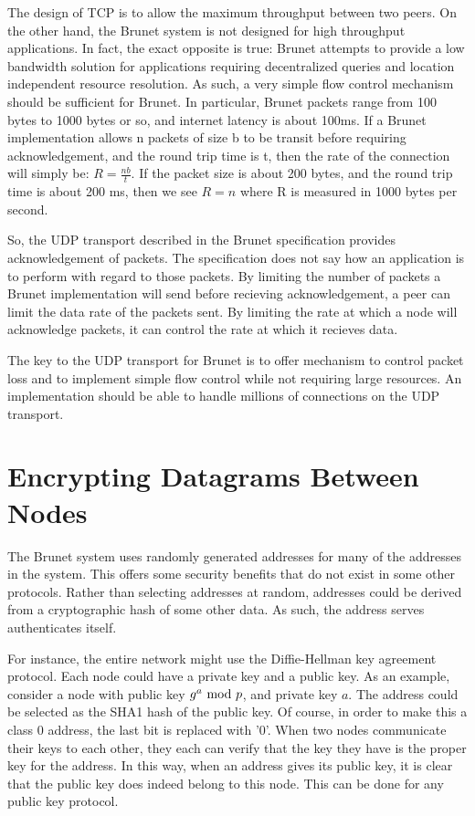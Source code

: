 \documentclass[11pt]{article}
\begin{document}
The design of TCP is to allow the maximum throughput between two peers.  On the
other hand, the Brunet system is not designed for high throughput applications.
In fact, the exact opposite is true: Brunet attempts to provide a low bandwidth
solution for applications requiring decentralized queries and location
independent resource resolution.  As such, a very simple flow control mechanism
should be sufficient for Brunet.  In particular, Brunet packets range from 100
bytes to 1000 bytes or so, and internet latency is about 100ms.  If a Brunet
implementation allows n packets of size b to be transit before requiring
acknowledgement, and the round trip time is t, then the rate of the connection
will simply be: $R=\frac{nb}{t}$.  If the packet size is about 200 bytes, and
the round trip time is about 200 ms, then we see $R=n$ where R is measured in
1000 bytes per second.

So, the UDP transport described in the Brunet specification provides
acknowledgement of packets.  The specification does not say how an application
is to perform with regard to those packets.  By limiting the number of packets
a Brunet implementation will send before recieving acknowledgement, a peer can
limit the data rate of the packets sent.  By limiting the rate at which a node
will acknowledge packets, it can control the rate at which it recieves data.

The key to the UDP transport for Brunet is to offer mechanism to control packet
loss and to implement simple flow control while not requiring large resources.
An implementation should be able to handle millions of connections on the UDP
transport.

\section{Encrypting Datagrams Between Nodes}
The Brunet system uses randomly generated addresses for many of the addresses in
the system.  This offers some security benefits that do not exist in some other
protocols.  Rather than selecting addresses at random, addresses could be
derived from a cryptographic hash of some other data.  As such, the address
serves authenticates itself.

For instance, the entire network might use the Diffie-Hellman key agreement
protocol.  Each node could have a private key and a public key.  As an example,
consider a node with public key $g^a \ {\rm mod}\ p$, and private key $a$.
The address could be selected as the SHA1 hash of the public key.  Of course, in
order to make this a class 0 address, the last bit is replaced with '0'.
When two nodes communicate their keys to each other, they each can verify that
the key they have is the proper key for the address.
In this way,
when an address gives its public key, it is clear that the public key does
indeed belong to this node.  This can be done for any public key protocol.
\end{document}
